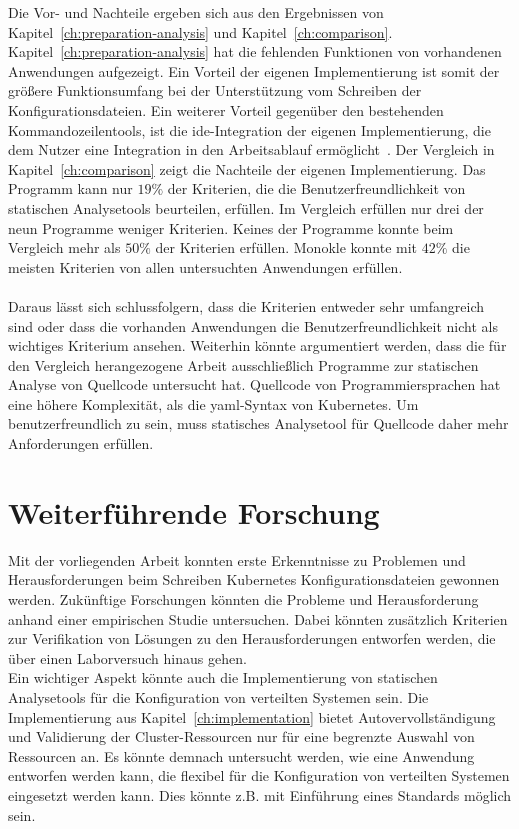 Die Vor- und Nachteile ergeben sich aus den Ergebnissen von Kapitel~\ref{ch:preparation-analysis} und Kapitel~\ref{ch:comparison}.
Kapitel~\ref{ch:preparation-analysis} hat die fehlenden Funktionen von vorhandenen Anwendungen aufgezeigt. Ein Vorteil der eigenen Implementierung ist
somit der größere Funktionsumfang bei der Unterstützung vom Schreiben der Konfigurationsdateien. Ein weiterer Vorteil gegenüber den bestehenden
Kommandozeilentools, ist die \ac{ide}-Integration der eigenen Implementierung, die dem Nutzer eine Integration in den Arbeitsablauf ermöglicht~\cite{usability-criteria-static-analysis-tools}.
Der Vergleich in Kapitel~\ref{ch:comparison} zeigt die Nachteile der eigenen Implementierung. Das Programm kann nur $19\%$ der Kriterien, die die
Benutzerfreundlichkeit von statischen Analysetools beurteilen, erfüllen. Im Vergleich erfüllen nur drei der neun Programme weniger Kriterien.
Keines der Programme konnte beim Vergleich mehr als $50\%$ der Kriterien erfüllen.
Monokle konnte mit $42\%$ die meisten Kriterien von allen untersuchten Anwendungen erfüllen.
\\\\
Daraus lässt sich schlussfolgern, dass die Kriterien entweder sehr umfangreich sind oder dass die vorhanden Anwendungen
die Benutzerfreundlichkeit nicht als wichtiges Kriterium ansehen.
Weiterhin könnte argumentiert werden, dass die für den Vergleich herangezogene Arbeit ausschließlich Programme zur statischen Analyse
von Quellcode untersucht hat. Quellcode von Programmiersprachen hat eine höhere Komplexität, als die \ac{yaml}-Syntax von Kubernetes.
Um benutzerfreundlich zu sein, muss statisches Analysetool für Quellcode daher mehr Anforderungen erfüllen.

\section{Weiterführende Forschung}

Mit der vorliegenden Arbeit konnten erste Erkenntnisse zu Problemen und Herausforderungen beim Schreiben Kubernetes
Konfigurationsdateien gewonnen werden. Zukünftige Forschungen könnten die Probleme und Herausforderung
anhand einer empirischen Studie untersuchen. Dabei könnten zusätzlich Kriterien zur Verifikation von Lösungen zu
den Herausforderungen entworfen werden, die über einen Laborversuch hinaus gehen.
\\
Ein wichtiger Aspekt könnte auch die Implementierung von statischen Analysetools für die Konfiguration von
verteilten Systemen sein. Die Implementierung aus Kapitel~\ref{ch:implementation} bietet Autovervollständigung und Validierung
der Cluster-Ressourcen nur für eine begrenzte Auswahl von Ressourcen an. Es könnte demnach untersucht werden,
wie eine Anwendung entworfen werden kann, die flexibel für die Konfiguration von verteilten Systemen eingesetzt werden kann.
Dies könnte z.B. mit Einführung eines Standards möglich sein.